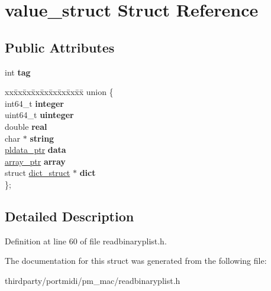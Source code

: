 \hypertarget{structvalue__struct}{}\section{value\+\_\+struct Struct Reference}
\label{structvalue__struct}
\subsection*{Public Attributes}
\begin{DoxyCompactItemize}
\item 
\mbox{\label{structvalue__struct_a451c0c45be11ca6802b0d4c6af95f321}} 
int {\bfseries tag}
\item 
\mbox{\label{structvalue__struct_a7bde4c8e0b12ab53007f781c13c848b8}} 
\begin{tabbing}
xx\=xx\=xx\=xx\=xx\=xx\=xx\=xx\=xx\=\kill
union \{\\
\>int64\_t {\bfseries integer}\\
\>uint64\_t {\bfseries uinteger}\\
\>double {\bfseries real}\\
\>char $\ast$ {\bfseries string}\\
\>\hyperlink{structpldata__struct}{pldata\_ptr} {\bfseries data}\\
\>\hyperlink{structarray__struct}{array\_ptr} {\bfseries array}\\
\>struct \hyperlink{structdict__struct}{dict\_struct} $\ast$ {\bfseries dict}\\
\}; \\

\end{tabbing}\end{DoxyCompactItemize}


\subsection{Detailed Description}


Definition at line 60 of file readbinaryplist.\+h.



The documentation for this struct was generated from the following file\+:\begin{DoxyCompactItemize}
\item 
thirdparty/portmidi/pm\+\_\+mac/readbinaryplist.\+h\end{DoxyCompactItemize}
